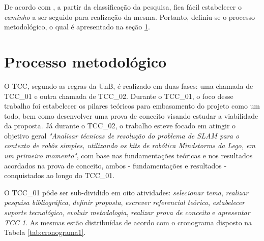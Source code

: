 	De acordo com \cite{fundamentosMetodologia}, a partir da classificação da pesquisa, fica fácil estabelecer o \textit{caminho} a ser seguido para realização da mesma. Portanto, definiu-se o processo metodológico, o qual é apresentado na seção \ref{sec:processo_metodológico}.


\section{Processo metodológico} %
\label{sec:processo_metodológico}


O TCC, segundo as regras da UnB, é realizado em duas fases: uma chamada de TCC\_01 e outra chamada de TCC\_02. Durante o TCC\_01, o foco desse trabalho foi estabelecer os pilares teóricos para embasamento do projeto como um todo, bem como desenvolver uma prova de conceito visando estudar a viabilidade da proposta. Já durante o TCC\_02, o trabalho esteve focado em atingir o objetivo geral \textit{"Analisar técnicas de resolução do problema de SLAM para o contexto de robôs simples, utilizando os kits de robótica \textit{Mindstorms} da Lego, em um primeiro momento"}, com base nas fundamentações teóricas e nos resultados acordados na prova de conceito, ambos - fundamentações e resultados - conquistados ao longo do TCC\_01.

O TCC\_01 pôde ser sub-dividido em oito atividades: \textit{selecionar tema}, \textit{realizar pesquisa bibliográfica}, \textit{definir proposta}, \textit{escrever referencial teórico}, \textit{estabelecer suporte tecnológico}, \textit{evoluir metodologia}, \textit{realizar prova de conceito} e \textit{apresentar TCC 1}. As mesmas estão distribuídas de acordo com o cronograma disposto na Tabela \ref{tab:cronograma1}.

